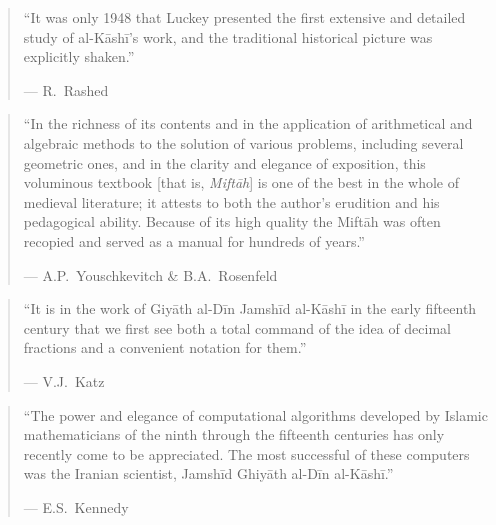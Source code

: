 \documentclass[11pt,a4paper]{article}
\begin{document}
\vspace{0.3cm}

\begin{quote}
``It was only 1948 that Luckey presented the first extensive and
detailed study of al-K\=ash\=i's work, and the traditional historical
picture was explicitly shaken.''
\begin{flushright}
--- R.\ Rashed
\end{flushright}
\end{quote}

\vspace{0.3cm}

\begin{quote}
``In the richness of its contents and in the application of
arithmetical and algebraic methods to the solution of various
problems, including several geometric ones, and in the clarity and
elegance of exposition, this voluminous textbook [that is,
\textit{Mift\=ah}] is one of the best in the whole of medieval
literature; it attests to both the author's erudition and his
pedagogical ability. Because of its high quality the Mift\=ah was
often recopied and served as a manual for hundreds of years.''
\begin{flushright}
--- A.P.\ Youschkevitch \& B.A.\ Rosenfeld
\end{flushright}
\end{quote}

\vspace{0.3cm}

\begin{quote}
``It is in the work of Giy\=ath al-D\=in Jamsh\=id al-K\=ash\=i in the early
fifteenth century that we first see both a total command of the idea
of decimal fractions and a convenient notation for them.''
\begin{flushright}
--- V.J.\ Katz
\end{flushright}
\end{quote}

\vspace{0.3cm}

\begin{quote}
``The power and elegance of computational algorithms developed by
Islamic mathematicians of the ninth through the fifteenth centuries
has only recently come to be appreciated. The most successful of
these computers was the Iranian scientist, Jamsh\=id Ghiy\=ath al-D\=in
al-K\=ash\=i.''
\begin{flushright}
--- E.S.\ Kennedy
\end{flushright}
\end{quote}
\end{document}
